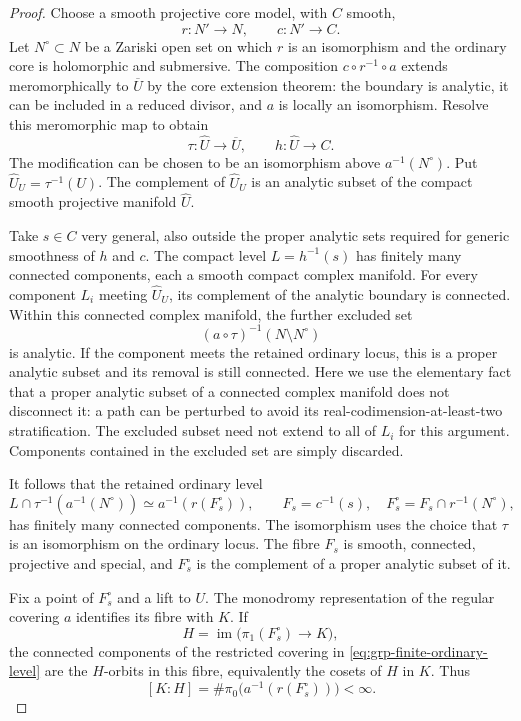 \begin{proof}
Choose a smooth projective core model, with $C$ smooth,
\[
 r:N'\longrightarrow N,\qquad c:N'\longrightarrow C.
\]
Let $N^\circ\subset N$ be a Zariski open set on which $r$ is an isomorphism and the ordinary core is holomorphic and submersive. The composition $c\circ r^{-1}\circ a$ extends meromorphically to $\overline U$ by the core extension theorem: the boundary is analytic, it can be included in a reduced divisor, and $a$ is locally an isomorphism.  Resolve this meromorphic map to obtain
\[
 \tau:\widehat U\longrightarrow\overline U,
 \qquad h:\widehat U\longrightarrow C.
\]
The modification can be chosen to be an isomorphism above $a^{-1}(N^\circ)$.  Put $\widehat U_U=\tau^{-1}(U)$. The complement of $\widehat U_U$ is an analytic subset of the compact smooth projective manifold $\widehat U$.

Take $s\in C$ very general, also outside the proper analytic sets required for generic smoothness of $h$ and $c$.  The compact level $L=h^{-1}(s)$ has finitely many connected components, each a smooth compact complex manifold.  For every component $L_i$ meeting $\widehat U_U$, its complement of the analytic boundary is connected. Within this connected complex manifold, the further excluded set
\[
 (a\circ\tau)^{-1}(N\setminus N^\circ)
\]
is analytic.  If the component meets the retained ordinary locus, this is a proper analytic subset and its removal is still connected. Here we use the elementary fact that a proper analytic subset of a connected complex manifold does not disconnect it: a path can be perturbed to avoid its real-codimension-at-least-two stratification. The excluded subset need not extend to all of $L_i$ for this argument. Components contained in the excluded set are simply discarded.

It follows that the retained ordinary level
\begin{equation}\label{eq:grp-finite-ordinary-level}
 L\cap\tau^{-1}(a^{-1}(N^\circ))
 \simeq a^{-1}(r(F_s^\circ)),
 \qquad
 F_s=c^{-1}(s),\quad F_s^\circ=F_s\cap r^{-1}(N^\circ),
\end{equation}
has finitely many connected components.  The isomorphism uses the choice that $\tau$ is an isomorphism on the ordinary locus.  The fibre $F_s$ is smooth, connected, projective and special, and $F_s^\circ$ is the complement of a proper analytic subset of it.

Fix a point of $F_s^\circ$ and a lift to $U$.  The monodromy representation of the regular covering $a$ identifies its fibre with $K$.  If
\[
 H=\operatorname{im}\bigl(\pi_1(F_s^\circ)\longrightarrow K\bigr),
\]
the connected components of the restricted covering in \eqref{eq:grp-finite-ordinary-level} are the $H$-orbits in this fibre, equivalently the cosets of $H$ in $K$.  Thus
\begin{equation}\label{eq:grp-index-equals-components}
 [K:H]=\#\pi_0\bigl(a^{-1}(r(F_s^\circ))\bigr)<\infty.
\end{equation}


\end{proof}

